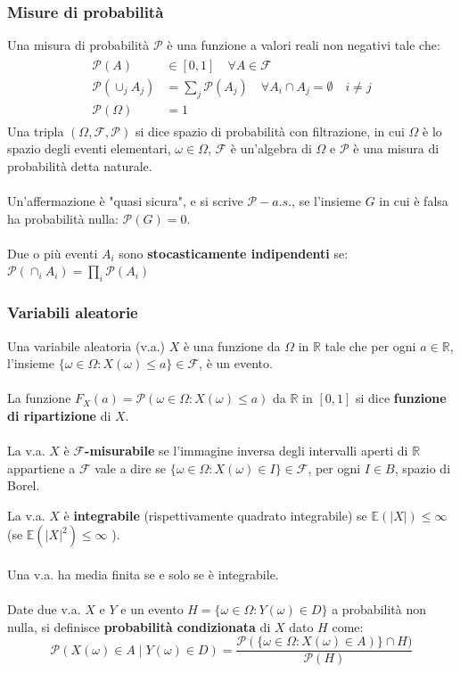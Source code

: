 \documentclass{beamer}
\begin{document}
\begin{frame}
\frametitle{Misure di probabilità}
	Una misura di probabilità $\mathcal{P}$ è una funzione a valori reali non negativi tale che:
	\begin{align}
	\begin{split}
		\mathcal{P}(A) &\in [0,1] \quad \forall A \in \mathcal{F} \\
		\mathcal{P}(\cup_j A_j)&=\sum_{j}\mathcal{P}(A_j) \quad \forall A_i\cap A_j =\emptyset \quad i\neq j\\
		\mathcal{P}(\Omega)&=1
	\end{split}
	\end{align}
	Una tripla $(\Omega, \mathcal{F},\mathcal{P})$ si dice spazio di probabilità con filtrazione, in cui $\Omega$ è lo spazio degli eventi elementari, $\omega \in \Omega$, $\mathcal{F}$ è un'algebra di $\Omega$ e $\mathcal{P}$ è una misura di probabilità detta naturale.
	\\~\\
	Un'affermazione è "quasi sicura", e si scrive $\mathcal{P}-a.s.$, se l'insieme $G$ in cui è falsa ha probabilità nulla: $\mathcal{P}(G)=0$.
	\\~\\
	Due o più eventi $A_i$ sono \textbf{stocasticamente indipendenti} se:
	$\mathcal{P}\left(\cap_i A_i \right) = \prod_{i} \mathcal{P}(A_i)$

	
\end{frame}

\begin{frame}
\frametitle{Variabili aleatorie}
	 Una variabile aleatoria (v.a.) $X$ è una funzione da $\Omega$ in $\mathbb{R}$ tale che per ogni $a \in \mathbb{R}$, l'insieme $\{\omega \in\Omega: X(\omega)\leq a\}	\in \mathcal{F}$, è un evento.
	 \\~\\
	 La funzione $F_X(a) = \mathcal{P}(\omega 	\in \Omega : X(\omega) \leq a)$ da $\mathbb{R}$ in $[0,1]$ si dice \textbf{funzione di ripartizione} di $X$.
	 \\~\\
	 La v.a. $X$ è \textbf{$\mathcal{F}$-misurabile} se l'immagine inversa degli intervalli aperti di $\mathbb{R}$ appartiene a $\mathcal{F}$ vale a dire se $\{\omega\in \Omega : X(\omega)\in I \} \in \mathcal{F}$, per ogni $I \in B$, spazio di Borel.


\end{frame}
\begin{frame}
	 La v.a. $X$ è \textbf{integrabile} (rispettivamente quadrato integrabile) se $\mathbb{E}(|X|)\leq \infty$ (se $\mathbb{E}(|X|^2)\leq \infty$ ).
	\\~\\
	Una v.a. ha media finita se e solo se è integrabile.
	\\~\\
	Date due v.a. $X$ e $Y$ e un evento $H= \{\omega \in \Omega:Y(\omega) \in D \}$ a probabilità non nulla, si definisce \textbf{probabilità condizionata} di $X$ dato $H$ come:
		$$	\mathcal{P}(X(\omega)\in A \mid Y(\omega)\in D)= \frac{\mathcal{P}(\{\omega \in \Omega:X(\omega) \in A)\} \cap H)}{\mathcal{P}(H)}$$
\end{frame}
\end{document}
